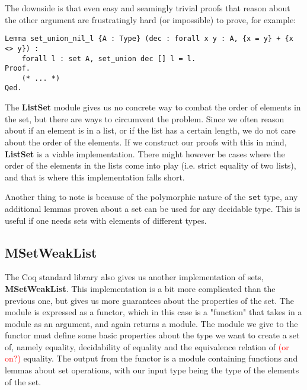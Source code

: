 The downside is that even easy and seamingly trivial proofs that reason about the other argument are frustratingly hard
(or impossible) to prove, for example:

\begin{minipage}{\linewidth}
\begin{lstlisting}[language=Coq, label={lst:set_op_ex2}, caption={Hard proof of lemma in \lstinline{ListSet}}]
Lemma set_union_nil_l {A : Type} (dec : forall x y : A, {x = y} + {x <> y}) :
    forall l : set A, set_union dec [] l = l.
Proof.
    (* ... *)
Qed.
\end{lstlisting}
\end{minipage}

The \textbf{ListSet} module gives us no concrete way to combat the order of elements in the set,
but there are ways to circumvent the problem.
Since we often reason about if an element is in a list, or if the list has a certain length,
we do not care about the order of the elements.
If we construct our proofs with this in mind, \textbf{ListSet} is a viable implementation.
There might however be cases where the order of the elements in the lists come into play (i.e. strict equality of two lists),
and that is where this implementation falls short.

Another thing to note is because of the polymorphic nature of the \lstinline{set} type, any additional lemmas proven about a set can be
used for any decidable type. This is useful if one needs sets with elements of different types.

\subsection{MSetWeakList}

The Coq standard library also gives us another implementation of sets, \textbf{MSetWeakList}.
This implementation is a bit more complicated than the previous one,
but gives us more guarantees about the properties of the set.
The module is expressed as a functor, which in this case is a "function" that takes in a module as an argument, and again returns a module.
The module we give to the functor must define some basic properties about the type we want to create a set of,
namely equality, decidability of equality and the equivalence relation of \textcolor{red}{(or on?)} equality.
The output from the functor is a module containing functions and lemmas about set operations,
with our input type being the type of the elements of the set.

